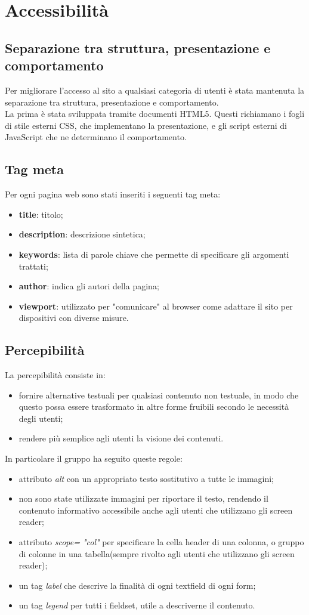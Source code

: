 \section{Accessibilità}
\subsection{Separazione tra struttura, presentazione e comportamento}
Per migliorare l'accesso al sito a qualsiasi categoria di utenti è stata mantenuta la separazione tra struttura, presentazione e comportamento. \\
La prima è stata sviluppata tramite documenti HTML5. Questi richiamano i fogli di stile esterni CSS, che implementano la presentazione, e gli script esterni di JavaScript che ne determinano il comportamento.
\subsection{Tag meta}
Per ogni pagina web sono stati inseriti i seguenti tag meta:
\begin{itemize}
	\item \textbf{title}: titolo;
	\item \textbf{description}: descrizione sintetica;
	\item \textbf{keywords}: lista di parole chiave che permette di specificare gli argomenti trattati;
	\item \textbf{author}: indica gli autori della pagina;
	\item \textbf{viewport}: utilizzato per "comunicare" al browser come adattare il sito per dispositivi con diverse misure.
\end{itemize}


\subsection{Percepibilità}
La percepibilità consiste in: 
	\begin{itemize}
		\item fornire alternative testuali per qualsiasi contenuto non testuale, in modo che questo possa essere trasformato in altre forme fruibili secondo le necessità degli utenti;
		\item rendere più semplice agli utenti la visione dei contenuti.
	\end{itemize}
	In particolare il gruppo ha seguito queste regole:
	\begin{itemize}
		\item attributo \textit{alt} con un appropriato testo sostitutivo a tutte le immagini;
		\item non sono state utilizzate immagini per riportare il testo, rendendo il contenuto informativo accessibile anche agli utenti che utilizzano gli screen reader;
		\item attributo \textit{scope= "col"} per specificare la cella header di una colonna, o gruppo di colonne in una tabella(sempre rivolto agli utenti che utilizzano gli screen reader);
		\item un tag \textit{label} che descrive la finalità di ogni textfield di ogni form;
		\item un tag \textit{legend} per tutti i fieldset, utile a descriverne il contenuto.
	\end{itemize}
